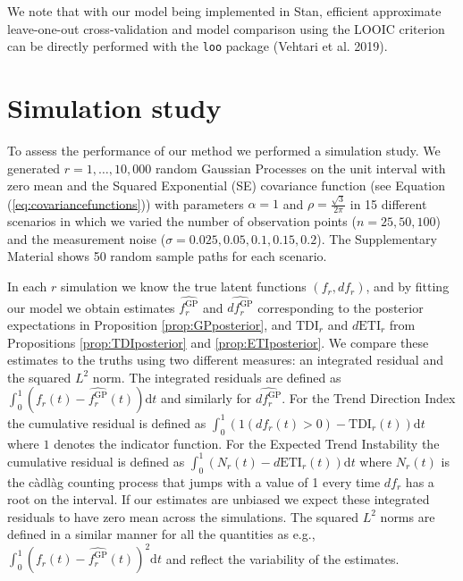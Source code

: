 \documentclass[
  11pt,
]{article}
\theoremstyle{nonumberplain}
\begin{document}
We note that with our model being implemented in Stan, efficient
approximate leave-one-out cross-validation and model comparison using
the LOOIC criterion can be directly performed with the \texttt{loo}
package (Vehtari et al. 2019).

\hypertarget{sec:simulation}{%
\section{Simulation study}\label{sec:simulation}}

To assess the performance of our method we performed a simulation study.
We generated \(r = 1,\ldots, 10,000\) random Gaussian Processes on the
unit interval with zero mean and the Squared Exponential (SE) covariance
function (see Equation (\ref{eq:covariancefunctions})) with parameters
\(\alpha = 1\) and \(\rho = \frac{\sqrt{3}}{{2\pi}}\) in 15 different
scenarios in which we varied the number of observation points
(\(n = 25, 50, 100\)) and the measurement noise
(\(\sigma = 0.025, 0.05, 0.1, 0.15, 0.2\)). The Supplementary Material
shows 50 random sample paths for each scenario.

In each \(r\) simulation we know the true latent functions
\((f_r, df_r)\), and by fitting our model we obtain estimates
\(\widehat{f_r^\text{GP}}\) and \(\widehat{df_r^\text{GP}}\)
corresponding to the posterior expectations in Proposition
\ref{prop:GPposterior}, and \(\mathrm{TDI}_r\) and \(d\mathrm{ETI}_r\)
from Propositions \ref{prop:TDIposterior} and \ref{prop:ETIposterior}.
We compare these estimates to the truths using two different measures:
an integrated residual and the squared \(L^2\) norm. The integrated
residuals are defined as
\(\int_0^1 (f_r(t) - \widehat{f_r^\text{GP}}(t))\mathrm{d}t\) and
similarly for \(\widehat{df_r^\text{GP}}\). For the Trend Direction
Index the cumulative residual is defined as
\(\int_0^1 (1(df_r(t) > 0) - \mathrm{TDI}_r(t))\mathrm{d}t\) where \(1\)
denotes the indicator function. For the Expected Trend Instability the
cumulative residual is defined as
\(\int_0^1(N_r(t) - d\mathrm{ETI}_r(t))\mathrm{d}t\) where \(N_r(t)\) is
the càdlàg counting process that jumps with a value of 1 every time
\(df_r\) has a root on the interval. If our estimates are unbiased we
expect these integrated residuals to have zero mean across the
simulations. The squared \(L^2\) norms are defined in a similar manner
for all the quantities as e.g.,
\(\int_0^1 (f_r(t) - \widehat{f_r^\text{GP}}(t))^2\mathrm{d}t\) and
reflect the variability of the estimates.
\end{document}
